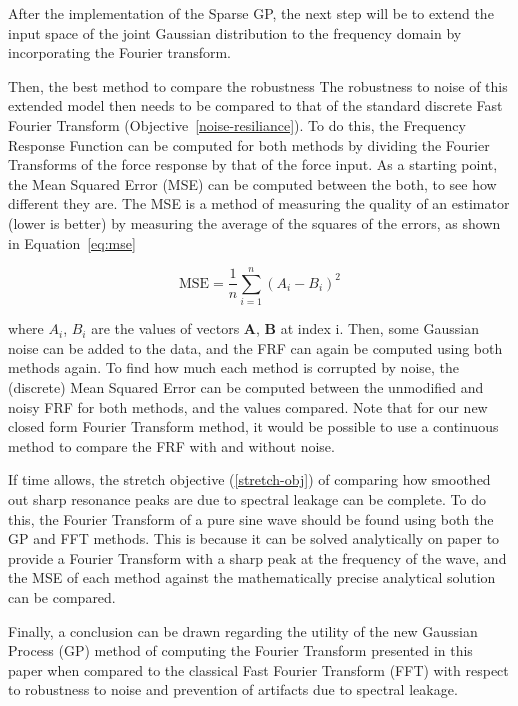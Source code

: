 \documentclass[12pt]{article}
\begin{document}
    After the implementation of the Sparse GP, the next step will be to extend the input space of the joint Gaussian distribution to the frequency domain by incorporating the Fourier transform.

    Then, the best method to compare the robustness
    The robustness to noise of this extended model then needs to be compared to that of the standard discrete Fast Fourier Transform (Objective~\ref{noise-resiliance}).
    To do this, the Frequency Response Function can be computed for both methods by dividing the Fourier Transforms of the force response by that of the force input.
    As a starting point, the Mean Squared Error (MSE) can be computed between the both, to see how different they are.
    The MSE is a method of measuring the quality of an estimator (lower is better) by measuring the average of the squares of the errors, as shown in Equation~\ref{eq:mse}

    \begin{equation}
        \text{MSE} = \frac{1}{n} \sum_{i=1}^{n} (A_i - B_i)^2
        \label{eq:mse}
    \end{equation}


    where $A_i$, $B_i$ are the values of vectors $\mathbf{A}$, $\mathbf{B}$ at index i.
    Then, some Gaussian noise can be added to the data, and the FRF can again be computed using both methods again.
    To find how much each method is corrupted by noise, the (discrete) Mean Squared Error can be computed between the unmodified and noisy FRF for both methods, and the values compared.
    Note that for our new closed form Fourier Transform method, it would be possible to use a continuous method to compare the FRF with and without noise.

    If time allows, the stretch objective (\ref{stretch-obj}) of comparing how smoothed out sharp resonance peaks are due to spectral leakage can be complete.
    To do this, the Fourier Transform of a pure sine wave should be found using both the GP and FFT methods.
    This is because it can be solved analytically on paper to provide a Fourier Transform with a sharp peak at the frequency of the wave, and the MSE of each method against the mathematically precise analytical solution can be compared.

    Finally, a conclusion can be drawn regarding the utility of the new Gaussian Process (GP) method of computing the Fourier Transform presented in this paper when compared to the classical Fast Fourier Transform (FFT) with respect to robustness to noise and prevention of artifacts due to spectral leakage.
\end{document}
